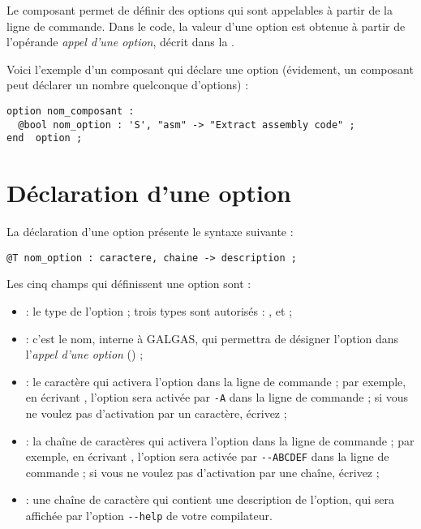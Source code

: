 


Le composant  permet de définir des options qui sont appelables à partir de la ligne de commande. Dans le code, la valeur d'une option est obtenue à partir de l'opérande \emph{appel d'une option}, décrit dans la .

Voici l'exemple d'un composant  qui déclare une option (évidement, un composant  peut déclarer un nombre quelconque d'options) :
\begin{lstlisting}[language=galgas]
option nom_composant :
  @bool nom_option : 'S', "asm" -> "Extract assembly code" ;
end  option ;
\end{lstlisting}


\section{Déclaration d'une option}

La déclaration d'une option présente le syntaxe suivante :
\begin{lstlisting}[language=galgas]
  @T nom_option : caractere, chaine -> description ;
\end{lstlisting}

Les cinq champs qui définissent une option sont :
\begin{itemize}
  \item {} : le type de l'option ; trois types sont autorisés : ,  et  ;
  \item {} : c'est le nom, interne à GALGAS, qui permettra de désigner l'option dans l'\emph{appel d'une option} () ; 
  \item {} : le caractère qui activera l'option dans la ligne de commande ; par exemple, en écrivant , l'option sera activée par \texttt{-A} dans la ligne de commande ; si vous ne voulez pas d'activation par un caractère, écrivez  ;
  \item {} : la chaîne de caractères qui activera l'option dans la ligne de commande ; par exemple, en écrivant , l'option sera activée par \texttt{-{}-ABCDEF} dans la ligne de commande ; si vous ne voulez pas d'activation par une chaîne, écrivez  ;
  \item {} : une chaîne de caractère qui contient une description de l'option, qui sera affichée par l'option \texttt{-{}-help} de votre compilateur.
\end{itemize}








